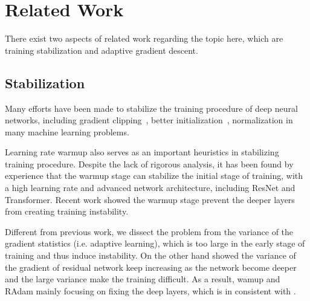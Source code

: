 
\section{Related Work}

There exist two aspects of related work regarding the topic here, which are training stabilization and adaptive gradient descent.

\subsection{Stabilization}
Many efforts have been made to stabilize the training procedure of deep neural networks, including gradient clipping~\citep{bengio2013advances}, better initialization~\citep{balduzzi2017shattered,zhang2019fixup}, normalization in many machine learning problems. 

Learning rate warmup \citep{vaswani2017attention,goyal2017accurate} also serves as an important heuristics in stabilizing training procedure. Despite the lack of rigorous analysis, it has been found by experience that the warmup stage can stabilize the initial stage of training, with a high learning rate and advanced network architecture, including ResNet and Transformer. 
Recent work \citep{gotmare2018a} showed the warmup stage prevent the deeper layers from creating training instability. 

Different from previous work, we dissect the problem from the variance of the gradient statistics (i.e. adaptive learning), which is too large in the early stage of training and thus induce instability. On the other hand \citep{balduzzi2017shattered} showed the variance of the gradient of residual network keep increasing as the network become deeper and the large variance make the training  difficult. As a result, wamup and RAdam mainly focusing on fixing the deep layers, which is in consistent with \citep{gotmare2018a}.





